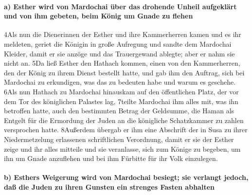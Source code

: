 \hypertarget{a-esther-wird-von-mardochai-uxfcber-das-drohende-unheil-aufgekluxe4rt-und-von-ihm-gebeten-beim-kuxf6nig-um-gnade-zu-flehen}{%
\paragraph{a) Esther wird von Mardochai über das drohende Unheil
aufgeklärt und von ihm gebeten, beim König um Gnade zu
flehen}\label{a-esther-wird-von-mardochai-uxfcber-das-drohende-unheil-aufgekluxe4rt-und-von-ihm-gebeten-beim-kuxf6nig-um-gnade-zu-flehen}}

4Als nun die Dienerinnen der Esther und ihre Kammerherren kamen und es
ihr meldeten, geriet die Königin in große Aufregung und sandte dem
Mardochai Kleider, damit er sie anzöge und das Trauergewand ablegte;
aber er nahm sie nicht an. 5Da ließ Esther den Hathach kommen, einen von
den Kammerherren, den der König zu ihrem Dienst bestellt hatte, und gab
ihm den Auftrag, sich bei Mardochai zu erkundigen, was das zu bedeuten
habe und warum es geschehe. 6Als nun Hathach zu Mardochai hinauskam auf
den öffentlichen Platz, der vor dem Tor des königlichen Palastes lag,
7teilte Mardochai ihm alles mit, was ihn betroffen hatte, auch den
bestimmten Betrag der Geldsumme, die Haman als Entgelt für die Ermordung
der Juden an die königliche Schatzkammer zu zahlen versprochen hatte.
8Außerdem übergab er ihm eine Abschrift der in Susa zu ihrer
Niedermetzelung erlassenen schriftlichen Verordnung, damit er sie der
Esther zeige und ihr alles mitteile und sie veranlasse, sich zum Könige
zu begeben, um ihn um Gnade anzuflehen und bei ihm Fürbitte für ihr Volk
einzulegen.

\hypertarget{b-esthers-weigerung-wird-von-mardochai-besiegt-sie-verlangt-jedoch-dauxdf-die-juden-zu-ihren-gunsten-ein-strenges-fasten-abhalten}{%
\paragraph{b) Esthers Weigerung wird von Mardochai besiegt; sie verlangt
jedoch, daß die Juden zu ihren Gunsten ein strenges Fasten
abhalten}\label{b-esthers-weigerung-wird-von-mardochai-besiegt-sie-verlangt-jedoch-dauxdf-die-juden-zu-ihren-gunsten-ein-strenges-fasten-abhalten}}

